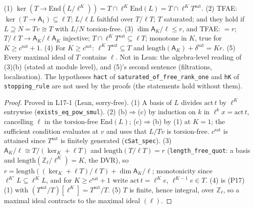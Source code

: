 \begin{proposition}\label{prop:saturation}
  \leanok
  (1) $\ker(T\to\mathrm{End}(L/\ell^K))=T\cap\ell^K\mathrm{End}(L)=T\cap\ell^KT^{\mathrm{sat}}$. (2) TFAE: $\ker(T\to\mathsf A_1)\subseteq\ell T$;
  $L/\ell L$ faithful over $T/\ell T$; $T$ saturated; and they hold if $L\supseteq N=Tv\cong T$ with $L/N$ torsion-free.
  (3) $\dim\mathsf A_K/\ell\le r$, and TFAE: $=r$; $T/\ell T\to\mathsf A_K/\ell\mathsf A_K$ injective; $T\cap\ell^KT^{\mathrm{sat}}\subseteq\ell T$;
  monotone in $K$, true for $K\ge c^{\mathrm{sat}}+1$. (4) For $K\ge c^{\mathrm{sat}}$: $\ell^KT^{\mathrm{sat}}\subseteq T$ and
  $\mathrm{length}(\mathsf A_K)+\delta^{\mathrm{sat}}=Kr$. (5) Every maximal ideal of $T$ contains $\ell$.
  Not in Lean: the algebra-level reading of (3)(b) (stated at module level), and (5)'s second
  sentence (filtrations, localisation). The hypotheses \texttt{hact} of \texttt{saturated\_of\_free\_rank\_one} and \texttt{hK}
  of \texttt{stopping\_rule} are not used by the proofs (the statements hold without them).
\end{proposition}
\begin{proof}
  \leanok
  Proved in L17-1 (Lean, sorry-free). (1) A basis of $L$ divides $\mathrm{act}\,t$ by $\ell^K$ entrywise
  (\texttt{exists\_eq\_pow\_smul}). (2) (b)$\Rightarrow$(c) by induction on $k$ in $\ell^kx=\mathrm{act}\,t$, cancelling $\ell$ in the
  torsion-free $\mathrm{End}(L)$; (c)$\Rightarrow$(b) by (1) at $K=1$; the sufficient condition evaluates at $v$ and uses that
  $L/Tv$ is torsion-free. $c^{\mathrm{sat}}$ is attained since $T^{\mathrm{sat}}$ is finitely generated (\texttt{cSat\_spec}).
  (3) $\mathsf A_K/\ell\cong T/(\ker_K+\ell T)$ and $\mathrm{length}(T/\ell T)=r$ (\texttt{length\_free\_quot}: a basis and
  $\mathrm{length}(\mathbb Z_\ell/\ell^K)=K$, the DVR), so $r=\mathrm{length}((\ker_K+\ell T)/\ell T)+\dim\mathsf A_K/\ell$;
  monotonicity since $\ell^{K'}L\subseteq\ell^KL$, and for $K\ge c^{\mathrm{sat}}+1$ write $\mathrm{act}\,t=\ell^Ke$,
  $\ell^{K-1}e\in T$. (4) is (P17)(1) with $(T^{\mathrm{sat}}/T)[\ell^K]=T^{\mathrm{sat}}/T$. (5) $T$ is finite, hence integral, over
  $\mathbb Z_\ell$, so a maximal ideal contracts to the maximal ideal $(\ell)$.
\end{proof}

